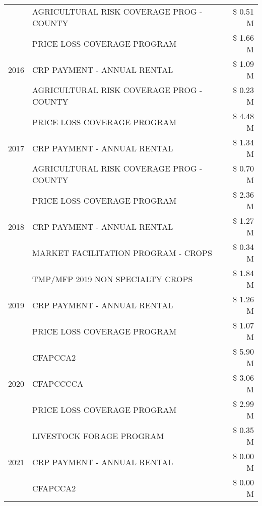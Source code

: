 \begin{tabular}{llr}
 & AGRICULTURAL RISK COVERAGE PROG - COUNTY & \$ 0.51 M \\
\cline{1-3}
\multirow[t]{3}{*}{2016} & PRICE LOSS COVERAGE PROGRAM & \$ 1.66 M \\
 & CRP PAYMENT - ANNUAL RENTAL & \$ 1.09 M \\
 & AGRICULTURAL RISK COVERAGE PROG - COUNTY & \$ 0.23 M \\
\cline{1-3}
\multirow[t]{3}{*}{2017} & PRICE LOSS COVERAGE PROGRAM & \$ 4.48 M \\
 & CRP PAYMENT - ANNUAL RENTAL & \$ 1.34 M \\
 & AGRICULTURAL RISK COVERAGE PROG - COUNTY & \$ 0.70 M \\
\cline{1-3}
\multirow[t]{3}{*}{2018} & PRICE LOSS COVERAGE PROGRAM & \$ 2.36 M \\
 & CRP PAYMENT - ANNUAL RENTAL & \$ 1.27 M \\
 & MARKET FACILITATION PROGRAM - CROPS & \$ 0.34 M \\
\cline{1-3}
\multirow[t]{3}{*}{2019} & TMP/MFP 2019 NON SPECIALTY CROPS & \$ 1.84 M \\
 & CRP PAYMENT - ANNUAL RENTAL & \$ 1.26 M \\
 & PRICE LOSS COVERAGE PROGRAM & \$ 1.07 M \\
\cline{1-3}
\multirow[t]{3}{*}{2020} & CFAPCCA2 & \$ 5.90 M \\
 & CFAPCCCCA & \$ 3.06 M \\
 & PRICE LOSS COVERAGE PROGRAM & \$ 2.99 M \\
\cline{1-3}
\multirow[t]{3}{*}{2021} & LIVESTOCK FORAGE PROGRAM & \$ 0.35 M \\
 & CRP PAYMENT - ANNUAL RENTAL & \$ 0.00 M \\
 & CFAPCCA2 & \$ 0.00 M \\
\cline{1-3}
\bottomrule
\end{tabular}
